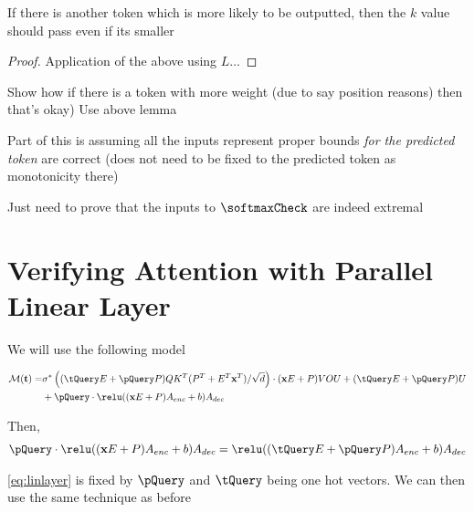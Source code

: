 \begin{lemma}
	If there is another token which is more likely to be outputted, then the $k$ value should pass even if its smaller
\end{lemma}
\begin{proof}
	Application of the above using $L$...
\end{proof}

\begin{lemma}
	Show how if there is a token with more weight (due to say position reasons) then that's okay)
	Use above lemma
\end{lemma}


\begin{lemma}
	Part of this is assuming all the inputs represent proper bounds \emph{for the predicted token} are correct (does not need to be fixed to the predicted token as monotonicity there)
\end{lemma}

\begin{theorem}
	Just need to prove that the inputs to $\softmaxCheck$ are indeed extremal
\end{theorem}

\section{Verifying Attention with Parallel Linear Layer}
We will use the following model

\begin{align}
	\mathcal{M}(\textbf{t}) =& \sigma^* 
	       \left( (\tQuery E + \pQuery  P) Q K^T  (P^T + E^T \textbf{x}^T) /\sqrt{d} \right) \cdot (\textbf{x}E+P)VOU + (\tQuery E + \pQuery P)U\\
        &+ \pQuery \cdot \relu((\textbf{x}E + P) A_{enc} + b) A_{dec}
\end{align}

Then,
\begin{align}\label{eq:linlayer}
    \pQuery \cdot \relu((\textbf{x}E + P) A_{enc} + b) A_{dec} = 
    \relu((\tQuery E + \pQuery P) A_{enc} + b) A_{dec}
\end{align}

\cref{eq:linlayer} is fixed by $\pQuery$ and $\tQuery$ being one hot vectors.
We can then use the same technique as before


